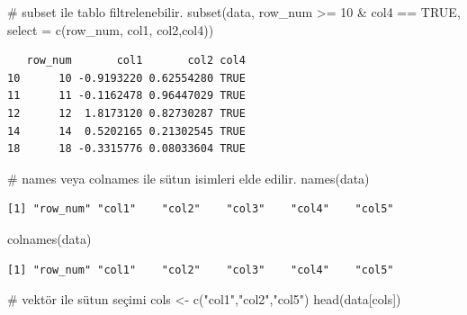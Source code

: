 \documentclass[
  letterpaper,
  DIV=11,
  numbers=noendperiod]{scrreprt}
\newenvironment{Shaded}{\begin{snugshade}}{\end{snugshade}}
\newcommand{\AttributeTok}[1]{\textcolor[rgb]{0.40,0.45,0.13}{#1}}
\newcommand{\CommentTok}[1]{\textcolor[rgb]{0.37,0.37,0.37}{#1}}
\newcommand{\DecValTok}[1]{\textcolor[rgb]{0.68,0.00,0.00}{#1}}
\newcommand{\FunctionTok}[1]{\textcolor[rgb]{0.28,0.35,0.67}{#1}}
\newcommand{\NormalTok}[1]{\textcolor[rgb]{0.00,0.23,0.31}{#1}}
\newcommand{\OtherTok}[1]{\textcolor[rgb]{0.00,0.23,0.31}{#1}}
\newcommand{\SpecialCharTok}[1]{\textcolor[rgb]{0.37,0.37,0.37}{#1}}
\newcommand{\StringTok}[1]{\textcolor[rgb]{0.13,0.47,0.30}{#1}}
\begin{document}
\begin{Shaded}
\begin{Highlighting}[]
\CommentTok{\# subset ile tablo filtrelenebilir.}
\FunctionTok{subset}\NormalTok{(data, }
\NormalTok{       row\_num }\SpecialCharTok{\textgreater{}=} \DecValTok{10} \SpecialCharTok{\&}\NormalTok{ col4 }\SpecialCharTok{==} \StringTok{\textquotesingle{}TRUE\textquotesingle{}}\NormalTok{,}
       \AttributeTok{select =} \FunctionTok{c}\NormalTok{(row\_num, col1, col2,col4))}
\end{Highlighting}
\end{Shaded}

\begin{verbatim}
   row_num       col1       col2 col4
10      10 -0.9193220 0.62554280 TRUE
11      11 -0.1162478 0.96447029 TRUE
12      12  1.8173120 0.82730287 TRUE
14      14  0.5202165 0.21302545 TRUE
18      18 -0.3315776 0.08033604 TRUE
\end{verbatim}

\begin{Shaded}
\begin{Highlighting}[]
\CommentTok{\# names veya colnames ile sütun isimleri elde edilir.}
\FunctionTok{names}\NormalTok{(data)}
\end{Highlighting}
\end{Shaded}

\begin{verbatim}
[1] "row_num" "col1"    "col2"    "col3"    "col4"    "col5"   
\end{verbatim}

\begin{Shaded}
\begin{Highlighting}[]
\FunctionTok{colnames}\NormalTok{(data)}
\end{Highlighting}
\end{Shaded}

\begin{verbatim}
[1] "row_num" "col1"    "col2"    "col3"    "col4"    "col5"   
\end{verbatim}

\begin{Shaded}
\begin{Highlighting}[]
\CommentTok{\# vektör ile sütun seçimi}
\NormalTok{cols }\OtherTok{\textless{}{-}} \FunctionTok{c}\NormalTok{(}\StringTok{"col1"}\NormalTok{,}\StringTok{"col2"}\NormalTok{,}\StringTok{"col5"}\NormalTok{)}
\FunctionTok{head}\NormalTok{(data[cols])}
\end{Highlighting}
\end{Shaded}
\end{document}

